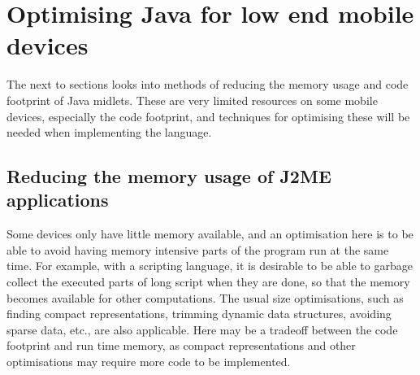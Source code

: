 \documentclass[11pt]{report}
\begin{document}
%
%
%
%
%

\section{Optimising Java for low end mobile devices}
The next to sections looks into methods of reducing the memory usage and code footprint of Java midlets.
These are very limited resources on some mobile devices, especially the code footprint, and techniques for optimising these will be needed when implementing the language.

\subsection{Reducing the memory usage of J2ME applications}

Some devices only have little memory available,
and an optimisation here is to be able to avoid having memory intensive parts of the program run at the same time. For example, with a scripting language, it is desirable to be able to garbage collect the executed parts of long script when they are done, so that the memory becomes available for other computations.
The usual size optimisations, such as finding compact representations, trimming dynamic data structures, avoiding sparse data, etc., are also applicable.
Here may be a tradeoff between the code footprint and run time memory, as compact representations and other optimisations may require more code to be implemented.
\end{document}

